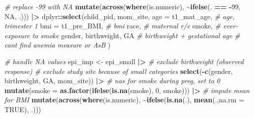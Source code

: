 \documentclass[12pt, twoside]{amherstthesis}
\newenvironment{Shaded}{\begin{snugshade}}{\end{snugshade}}
\newcommand{\AttributeTok}[1]{\textcolor[rgb]{0.13,0.29,0.53}{#1}}
\newcommand{\CommentTok}[1]{\textcolor[rgb]{0.56,0.35,0.01}{\textit{#1}}}
\newcommand{\ConstantTok}[1]{\textcolor[rgb]{0.56,0.35,0.01}{#1}}
\newcommand{\DecValTok}[1]{\textcolor[rgb]{0.00,0.00,0.81}{#1}}
\newcommand{\FunctionTok}[1]{\textcolor[rgb]{0.13,0.29,0.53}{\textbf{#1}}}
\newcommand{\NormalTok}[1]{#1}
\newcommand{\OtherTok}[1]{\textcolor[rgb]{0.56,0.35,0.01}{#1}}
\newcommand{\SpecialCharTok}[1]{\textcolor[rgb]{0.81,0.36,0.00}{\textbf{#1}}}
\begin{document}
\begin{Shaded}
\begin{Highlighting}[]
  \CommentTok{\# replace {-}99 with NA}
  \FunctionTok{mutate}\NormalTok{(}\FunctionTok{across}\NormalTok{(}\FunctionTok{where}\NormalTok{(is.numeric), }\SpecialCharTok{\textasciitilde{}}\FunctionTok{ifelse}\NormalTok{(. }\SpecialCharTok{==} \SpecialCharTok{{-}}\DecValTok{99}\NormalTok{, }\ConstantTok{NA}\NormalTok{, .)))  }\SpecialCharTok{|\textgreater{}} 
\NormalTok{  dplyr}\SpecialCharTok{::}\FunctionTok{select}\NormalTok{(child\_pid, mom\_site, }
                \AttributeTok{age =}\NormalTok{ t1\_mat\_age, }\CommentTok{\# age, trimester 1}
                \AttributeTok{bmi =}\NormalTok{ t1\_pre\_BMI, }\CommentTok{\# bmi}
\NormalTok{                race, }\CommentTok{\# maternal r/e}
\NormalTok{                smoke, }\CommentTok{\# ever{-}exposure to smoke}
\NormalTok{                gender, birthweight, GA }\CommentTok{\# birthweight + gestational age}
                \CommentTok{\# can\textquotesingle{}t find anemia measure or AsB}
\NormalTok{  ) }

\CommentTok{\# handle NA values}
\NormalTok{epi\_imp }\OtherTok{\textless{}{-}}\NormalTok{ epi\_small }\SpecialCharTok{|\textgreater{}} 
  \CommentTok{\# exclude birthweight (observed response)}
  \CommentTok{\# exclude study site because of small categories}
  \FunctionTok{select}\NormalTok{(}\SpecialCharTok{{-}}\FunctionTok{c}\NormalTok{(gender, birthweight, GA, mom\_site)) }\SpecialCharTok{|\textgreater{}} 
  \CommentTok{\# na\textquotesingle{}s for smoke during preg, set to 0}
  \FunctionTok{mutate}\NormalTok{(}\AttributeTok{smoke =} \FunctionTok{as.factor}\NormalTok{(}\FunctionTok{ifelse}\NormalTok{(}\FunctionTok{is.na}\NormalTok{(smoke), }\DecValTok{0}\NormalTok{, smoke))) }\SpecialCharTok{|\textgreater{}} 
  \CommentTok{\# impute mean for BMI}
  \FunctionTok{mutate}\NormalTok{(}\FunctionTok{across}\NormalTok{(}\FunctionTok{where}\NormalTok{(is.numeric), }
                \SpecialCharTok{\textasciitilde{}}\FunctionTok{ifelse}\NormalTok{(}\FunctionTok{is.na}\NormalTok{(.), }\FunctionTok{mean}\NormalTok{(.,}\AttributeTok{na.rm =} \ConstantTok{TRUE}\NormalTok{), .))) }
\end{Highlighting}
\end{Shaded}
\end{document}
